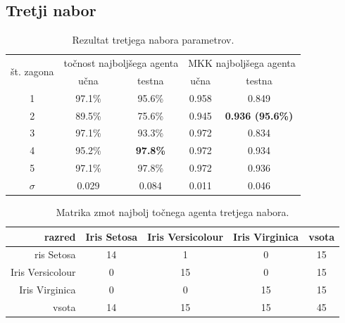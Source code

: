 \subsection{Tretji nabor}\label{subsec:dodatek-iris-tretji-nabor}
\begin{table}[H]
    \begin{center}
        \begin{tabular}{|| c | c c || c c ||}
            \hline
            \multirow{2}{*}{št. zagona} & \multicolumn{2}{c||}{točnost najboljšega agenta} & \multicolumn{2}{c||}{MKK najboljšega agenta} \\ \cline{2-5}
            & učna   & testna          & učna  & testna                  \\
            \hline
            1        & 97.1\% & 95.6\%          & 0.958 & 0.849                   \\
            \hline
            2        & 89.5\% & 75.6\%          & 0.945 & \textbf{0.936 (95.6\%)} \\
            \hline
            3        & 97.1\% & 93.3\%          & 0.972 & 0.834                   \\
            \hline
            4        & 95.2\% & \textbf{97.8\%} & 0.972 & 0.934                   \\
            \hline
            5        & 97.1\% & 97.8\%          & 0.972 & 0.936                   \\
            \hline
            $\sigma$ & 0.029  & 0.084           & 0.011 & 0.046                   \\
            \hline
        \end{tabular}
    \end{center}
    \caption{Rezultat tretjega nabora parametrov.}
    \label{tab:iris_result_3}
\end{table}

\begin{table}[H]
    \centering
    \begin{tabular}{||rcccc||}
        \hline
        razred           & Iris Setosa & Iris Versicolour & Iris Virginica & vsota \\ \hline
        ris Setosa       & 14          & 1                & 0              & 15    \\ \hline
        Iris Versicolour & 0           & 15               & 0              & 15    \\ \hline
        Iris Virginica   & 0           & 0                & 15             & 15    \\ \hline
        vsota            & 14          & 15               & 15             & 45    \\ \hline
    \end{tabular}
    \caption{Matrika zmot najbolj točnega agenta tretjega nabora.}
    \label{tab:iris_acc_3}
\end{table}

